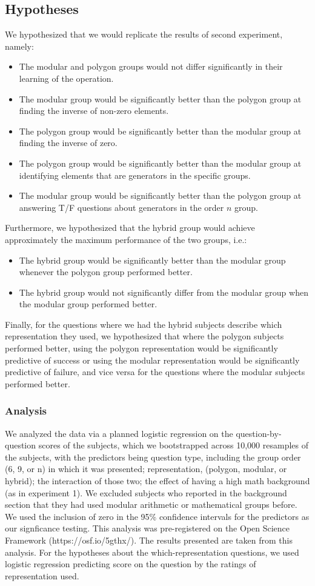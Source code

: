 \documentclass[11pt]{article}
\begin{document}
\subsection{Hypotheses}
We hypothesized that we would replicate the results of second experiment, namely: 
\begin{itemize} 
\item The modular and polygon groups would not differ significantly in their learning of the operation.
\item The modular group would be significantly better than the polygon group at finding the inverse of non-zero elements.
\item The polygon group would be significantly better than the modular group at finding the inverse of zero.
\item The polygon group would be significantly better than the modular group at identifying elements that are generators in the specific groups.
\item The modular group would be significantly better than the polygon group at answering T/F questions about generators in the order $n$ group.
\end{itemize}
Furthermore, we hypothesized that the hybrid group would achieve approximately the maximum performance of the two groups, i.e.: %
\begin{itemize}
\item The hybrid group would be significantly better than the modular group whenever the polygon group performed better.
\item The hybrid group would not significantly differ from the modular group when the modular group performed better.
\end{itemize}
Finally, for the questions where we had the hybrid subjects describe which representation they used, we hypothesized that where the polygon subjects performed better, using the polygon representation would be significantly predictive of success or using the modular representation would be significantly predictive of failure, and vice versa for the questions where the modular subjects performed better.
\subsubsection{Analysis}
We analyzed the data via a planned logistic regression on the question-by-question scores of the subjects, which we bootstrapped across 10,000 resamples of the subjects, with the predictors being question type, including the group order (6, 9, or n) in which it was presented; representation, (polygon, modular, or hybrid); the interaction of those two; the effect of having a high math background (as in experiment 1). We excluded subjects who reported in the background section that they had used modular arithmetic or mathematical groups before. We used the inclusion of zero in the 95\% confidence intervals for the predictors as our signficance testing. This analysis was pre-registered on the Open Science Framework (https://osf.io/5gthx/). The results presented are taken from this analysis. For the hypotheses about the which-representation questions, we used logistic regression predicting score on the question by the ratings of representation used.
\end{document}
